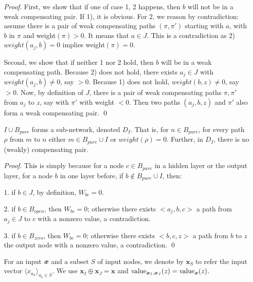 			\begin{proof}
				First, we show that if one of case 1, 2 happens, then $b$ will not be in a weak compensating pair. If 1), it is obvious. For 2, we reason by contradiction: assume there is a pair of weak compensating paths 	$(\pi,\pi')$ starting with $a$, with $b$ in $\pi$ and weight$(\pi) > 0$. It means that $a \in J$. This is a contradiction as 2) $weight({a_j,b})=0$ implies weight$(\pi)=0$.
				
				Second, we show that if neither 1 nor 2 hold, then $b$ will be in a weak compensating path.
				Because 2) does not hold, there exists $a_j \in J$ with $weight({a_j,b}) \neq 0$, say $>0$.
				Because 1) does not hold, $weight({b,z}) \neq 0$, say $>0$.
				Now, by definition of $J$, there is a pair of weak compensating paths $\pi,\pi'$ 
				from $a_j$ to $z$, say with $\pi'$ with weight $<0$.
				Then two paths $(a_j,b,z)$ and $\pi'$ also form a weak compensating pair. \qed
			\end{proof}
			
			\begin{lemma}\label{lem:subnetwork}
				$I \cup B_{pure} $ forms a sub-network, denoted $D_I$. That is, 
				for $n \in B_{pure}$, for every path $\rho$ from $m$ to $n$
				either $m \in B_{pure}\cup I$ or $weight(\rho)=0$.
				Further, in $D_I$, there is no (weakly) compensating pair.
			\end{lemma}

			

			
			\begin{proof}
				This is simply because for a node $c\in B_{pure}$ in a hidden layer or the output layer, for a node $b$ in one layer before, if $b\notin B_{pure}\cup I$, then:
				
				1. if $b\in J$, by definition, $W_{bc}=0$.
				
				2. if $b\in B_{open}$, then $W_{bc}=0$; otherwise there exists $<a_j,b,c>$ a path from $a_j\in J$ to $c$ with a nonzero value, a contradiction.
				
				3. if $b\in B_{zero}$, then $W_{bc}=0$; otherwise there exists $<b,c,z>$ a path from $b$ to $z$ the output node with a nonzero value, a contradiction. \qed
			\end{proof}
			
			
			
			For an input $\boldsymbol{x}$ and a subset $S$ of input nodes, we denote by $\boldsymbol{x}_S$ to refer the input vector $\langle x_{a_k}\rangle_{a_k\in S}$. We use $\boldsymbol{x}_I\oplus \boldsymbol{x}_J = \boldsymbol{x}$ and 
			${\textrm{value}}_{\boldsymbol{x}_I,\boldsymbol{x}_J} (z)={\textrm{value}}_{\boldsymbol{x}}(z)$. 
			
